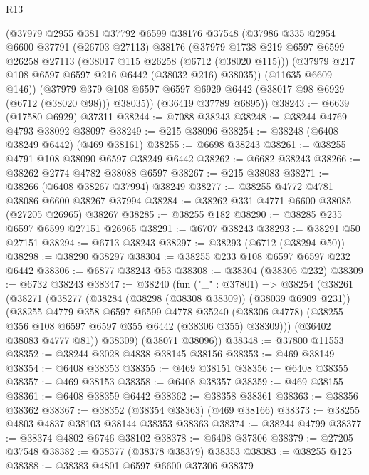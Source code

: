 \begin{lexlean}{R13}
\begin{coremodule}
      (@37979
        @2955
        @381
        @37792
        @6599
        @38176
        @37548
        (@37986
          @335
          @2954
          @6600
          @37791
          (@26703 @27113)
          @38176
          (@37979
            @1738
            @219
            @6597
            @6599
            @26258
            @27113
            (@38017 @115 @26258 (@6712 (@38020 @115)))
            (@37979 @217 @108 @6597 @6597 @216 @6442 (@38032 @216) @38035))
          (@11635 @6609 @146))
        (@37979 @379 @108 @6597 @6597 @6929 @6442 (@38017 @98 @6929 (@6712 (@38020 @98))) @38035))
      (@36419 @37789 @6895))
@38243 := @6639 (@17580 @6929) @37311
@38244 := @7088 @38243
@38248 := @38244 @4769 @4793 @38092 @38097
@38249 := @215 @38096
@38254 := @38248 (@6408 @38249 @6442) (@469 @38161)
@38255 := @6698 @38243
@38261 := @38255 @4791 @108 @38090 @6597 @38249 @6442
@38262 := @6682 @38243
@38266 := @38262 @2774 @4782 @38088 @6597
@38267 := @215 @38083
@38271 := @38266 (@6408 @38267 @37994) @38249
@38277 := @38255 @4772 @4781 @38086 @6600 @38267 @37994
@38284 := @38262 @331 @4771 @6600 @38085 (@27205 @26965) @38267
@38285 := @38255 @182
@38290 := @38285 @235 @6597 @6599 @27151 @26965
@38291 := @6707 @38243
@38293 := @38291 @50 @27151
@38294 := @6713 @38243
@38297 := @38293 (@6712 (@38294 @50))
@38298 := @38290 @38297
@38304 := @38255 @233 @108 @6597 @6597 @232 @6442
@38306 := @6877 @38243 @53
@38308 := @38304 (@38306 @232)
@38309 := @6732 @38243
@38347 := @38240
    (fun ("_" : @37801) =>
    @38254
      (@38261
        (@38271
          (@38277
            (@38284 (@38298 (@38308 @38309)) (@38039 @6909 @231))
            (@38255
              @4779
              @358
              @6597
              @6599
              @4778
              @35240
              (@38306 @4778)
              (@38255 @356 @108 @6597 @6597 @355 @6442 (@38306 @355) @38309)))
          (@36402 @38083 @4777 @81))
        @38309)
      (@38071 @38096))
@38348 := @37800 @11553
@38352 := @38244 @3028 @4838 @38145 @38156
@38353 := @469 @38149
@38354 := @6408 @38353
@38355 := @469 @38151
@38356 := @6408 @38355
@38357 := @469 @38153
@38358 := @6408 @38357
@38359 := @469 @38155
@38361 := @6408 @38359 @6442
@38362 := @38358 @38361
@38363 := @38356 @38362
@38367 := @38352 (@38354 @38363) (@469 @38166)
@38373 := @38255 @4803 @4837 @38103 @38144 @38353 @38363
@38374 := @38244 @4799
@38377 := @38374 @4802 @6746 @38102
@38378 := @6408 @37306
@38379 := @27205 @37548
@38382 := @38377 (@38378 @38379) @38353
@38383 := @38255 @125
@38388 := @38383 @4801 @6597 @6600 @37306 @38379

\end{coremodule}
\end{lexlean}

